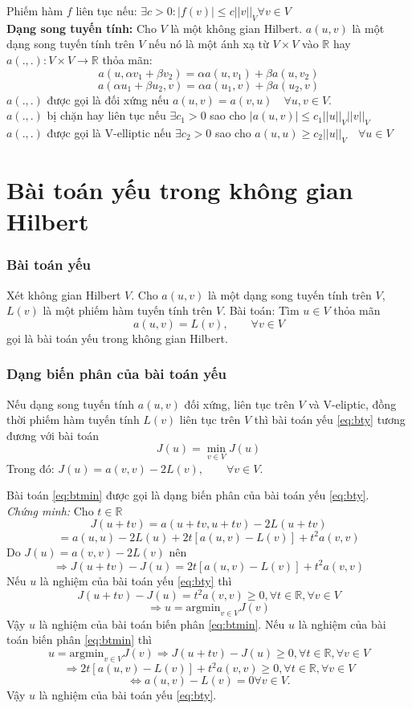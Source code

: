 \documentclass[
12pt, %
oneside, %
english, %
onehalfspacing, %
nolistspacing, %
headsepline, %
addchap,
]{MastersDoctoralThesis} %
\begin{document}
Phiếm hàm $f$ liên tục nếu: $\exists c>0:|f(v)|\leq c||v||_V \forall v\in V$\\
\textbf{Dạng song tuyến tính:} Cho $V$ là một không gian Hilbert. $a(u,v)$ là một dạng song tuyến tính trên $V$ nếu nó là một ánh xạ từ $V\times V$ vào $\mathbb{R}$ hay $a(.,.):V\times V\rightarrow \mathbb{R}$ thỏa mãn:
$$a(u, \alpha v_1+\beta v_2) = \alpha a(u,v_1)+\beta a(u,v_2)$$
$$a(\alpha u_1+\beta u_2,v) = \alpha a(u_1,v)+\beta a(u_2,v)$$
$a(.,.)$ được gọi là đối xứng nếu $a(u,v)=a(v,u) \quad \forall u,v\in V$.\\
$a(.,.)$ bị chặn hay liên tục nếu $\exists c_1>0$ sao cho $|a(u,v)|\leq c_1||u||_V||v||_V$\\
$a(.,.)$ được gọi là V-elliptic nếu $\exists c_2>0$ sao cho $a(u,u)\geq c_2||u||_V\quad\forall u\in V$
\section{Bài toán yếu trong không gian Hilbert}
\subsubsection*{Bài toán yếu}
Xét không gian Hilbert $V$. Cho $a(u,v)$ là một dạng song tuyến tính trên $V$, $L(v)$ là một phiếm hàm tuyến tính trên $V$. Bài toán: Tìm $u\in V$ thỏa mãn
\begin{equation}\label{eq:bty}
a(u,v) = L(v), \qquad \forall v\in V
\end{equation}
gọi là bài toán yếu trong không gian Hilbert.
\subsubsection*{Dạng biến phân của bài toán yếu}
\begin{lem}
Nếu dạng song tuyến tính $a(u,v)$ đối xứng, liên tục trên $V$ và V-eliptic, đồng thời phiếm hàm tuyến tính $L(v)$ liên tục trên $V$ thì bài toán yếu \ref{eq:bty} tương đương với bài toán
\begin{equation}\label{eq:btmin}
J(u)=\min_{v\in V} J(u)
\end{equation}
Trong đó: $J(u) = a(v,v)-2L(v),\qquad\forall v\in V.$
\end{lem}
Bài toán \ref{eq:btmin} được gọi là dạng biến phân của bài toán yếu \eqref{eq:bty}.\\
\textit{Chứng minh:} Cho $t\in \mathbb{R}$
$$J(u+tv)=a(u+tv,u+tv)-2L(u+tv)$$
$$= a(u,u)-2L(u)+2t[a(u,v)-L(v)]+t^2a(v,v)$$
Do $J(u) = a(v,v)-2L(v)$ nên
$$\Rightarrow J(u+tv)-J(u)=2t[a(u,v)-L(v)]+t^2a(v,v)$$
Nếu $u$ là nghiệm của bài toán yếu \ref{eq:bty} thì
$$J(u+tv)-J(u)=t^2a(v,v)\geq 0,\forall t\in\mathbb{R},\forall v\in V$$
$$\Rightarrow u=\text{argmin}_{v\in V}J(v)$$
Vậy $u$ là nghiệm của bài toán biến phân \ref{eq:btmin}.
Nếu $u$ là nghiệm của bài toán biến phân \ref{eq:btmin} thì
$$u=\text{argmin}_{v\in V}J(v) \Rightarrow J(u+tv)-J(u)\geq 0,\forall t\in\mathbb{R},\forall v\in V$$
$$\Rightarrow 2t[a(u,v)-L(v)]+t^2a(v,v)\geq 0 ,\forall t\in\mathbb{R},\forall v\in V$$
$$\Leftrightarrow a(u,v)-L(v)=0 \forall v\in V.$$
Vậy $u$ là nghiệm của bài toán yếu \ref{eq:bty}.
\end{document}
